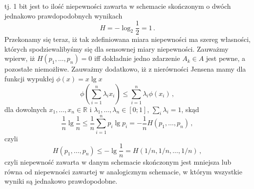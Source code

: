 \documentclass{myclass}
\begin{document}
tj. 1 bit jest to ilość niepewności zawarta w schemacie skończonym o  dwóch jednakowo
prawdopodobnych wynikach
\begin{equation*}
    H = -\log_2\frac{1}{2} = 1\,.
\end{equation*}
Przekonamy się teraz, iż tak zdefiniowana miara niepewności ma szereg własności, których
spodziewalibyśmy się dla sensownej miary niepewności. Zauważmy wpierw, iż \(H(p_1,\ldots,p_n) = 0\)
iff dokładnie jedno zdarzenie \(A_k \in A\) jest pewne, a pozostałe niemożliwe. Zauważmy dodatkowo,
iż z nierówności Jensena mamy dla funkcji wypukłej \(\phi(x) = x \lg x\)
\begin{equation*}
    \phi\left(\sum_{i=1}^n \lambda_i x_i\right) \leq \sum_{i=1}^n \lambda_i \phi(x_i)\,,
\end{equation*}
dla dowolnych \(x_1,\ldots,x_n \in \mathbb{R}\) i \(\lambda_1,\ldots,\lambda_n \in [0;1]\), \(\sum_i
\lambda_i = 1\), skąd
\begin{equation*}
    \frac{1}{n}\lg\frac{1}{n} \leq \frac{1}{n}\sum_{i=1}^n p_i \lg p_i = - \frac{1}{n}H(p_1,\ldots,p_n)\,,
\end{equation*}
czyli
\begin{equation*}
    H(p_1,\ldots,p_n) \leq - \lg\frac{1}{n} = H(1/n,1/n,\ldots,1/n)\,,
\end{equation*}
czyli niepewność zawarta w danym schemacie skończonym jest mniejsza lub równa od niepewności
zawartej w analogicznym schemacie, w którym wszystkie wyniki są jednakowo prawdopodobne.
\end{document}

